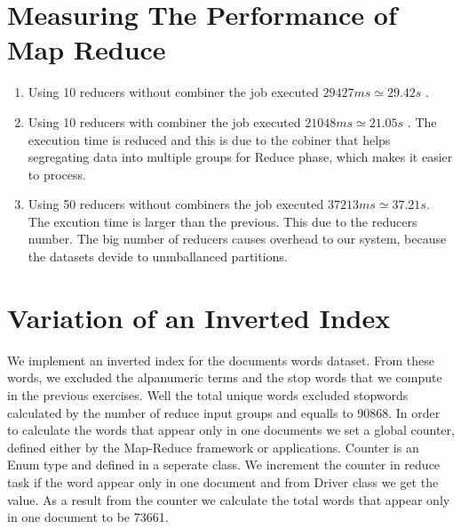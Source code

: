 \documentclass[paper=a4, fontsize=11pt]{scrartcl} %
\numberwithin{equation}{section} %
\numberwithin{figure}{section} %
\numberwithin{table}{section} %
\begin{document}
\section{Measuring The Performance of Map Reduce}

\begin{enumerate}
    \item Using 10 reducers without combiner the job executed $29427ms \simeq
    29.42 s$ .
    
    \item Using 10 reducers with combiner the job executed $21048ms \simeq
    21.05s$ . The execution time is reduced and this is due to the cobiner that
    helps segregating data into multiple groups for Reduce phase, which makes it
    easier to process.  
    
    \item Using 50 reducers without combiners the job executed $37213ms \simeq
    37.21s$. The excution time is larger than the previous. This due to the
    reducers number. The big number of reducers causes overhead to our system,
    because the datasets devide to unmballanced partitions. 

\end{enumerate}


\section{Variation of an Inverted Index}

We implement an inverted index for the documents words dataset. From these
words, we excluded the alpanumeric terms and the stop words that we compute in
the previous exercises. Well the total unique words excluded stopwords
calculated by the number of reduce input groups and equalls to 90868. In order
to calculate the words that appear only in one documents we set a global
counter, defined either by the Map-Reduce framework or applications. Counter is
an Enum type and defined in a seperate class. We increment the counter in reduce
task if the word appear only in one document and from Driver class we get the
value. As a result from the counter we calculate the total words that appear
only in one document to be 73661.





\end{document}
